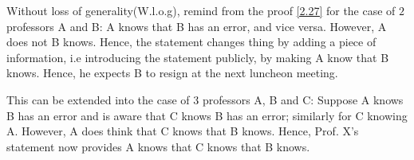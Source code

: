 \begin{solution} %
  Without loss of generality(W.l.o.g),
  remind from the proof \autoref{2.27} for the case of
  $2$ professors A and B: A knows that B has an error,
  and vice versa.
  However, A does not  B knows.
  Hence, the statement changes thing by adding
  a piece of information, i.e introducing the statement publicly,
  by making A know that B knows.
  Hence, he expects B to resign at the next luncheon
  meeting.
  \par
  \medskip
  This can be extended into the case of $3$ professors A, B
  and C: Suppose A knows B has an error and is aware
  that C knows B has an error; similarly for
  C knowing A. However, A does  think
  that C knows that B knows. Hence, Prof. X's statement
  now provides A knows that C knows that B knows.
\end{solution}
